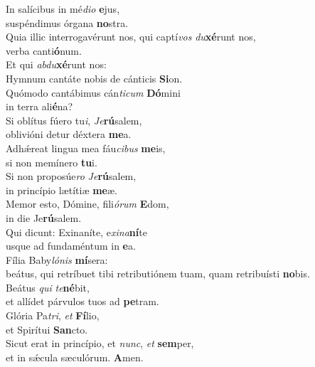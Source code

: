 \evenverse In salícibus in mé\textit{di}\textit{o} \textbf{e}jus,~\*\\
\evenverse suspéndimus órgana \textbf{no}stra.\\
\oddverse Quia illic interrogavérunt nos, qui captí\textit{vos} \textit{du}\textbf{xé}runt nos,~\*\\
\oddverse verba canti\textbf{ó}num.\\
\evenverse Et qui \textit{ab}\textit{du}\textbf{xé}runt nos:~\*\\
\evenverse Hymnum cantáte nobis de cánticis \textbf{Si}on.\\
\oddverse Quómodo cantábimus cán\textit{ti}\textit{cum} \textbf{Dó}mini~\*\\
\oddverse in terra ali\textbf{é}na?\\
\evenverse Si oblítus fúero tu\textit{i}, \textit{Je}\textbf{rú}salem,~\*\\
\evenverse oblivióni detur déxtera \textbf{me}a.\\
\oddverse Adhǽreat lingua mea fáu\textit{ci}\textit{bus} \textbf{me}is,~\*\\
\oddverse si non memínero \textbf{tu}i.\\
\evenverse Si non proposúe\textit{ro} \textit{Je}\textbf{rú}salem,~\*\\
\evenverse in princípio lætítiæ \textbf{me}æ.\\
\oddverse Memor esto, Dómine, fili\textit{ó}\textit{rum} \textbf{E}dom,~\*\\
\oddverse in die Je\textbf{rú}salem.\\
\evenverse Qui dicunt: Exinaníte, e\textit{xi}\textit{na}\textbf{ní}te~\*\\
\evenverse usque ad fundaméntum in \textbf{e}a.\\
\oddverse Fília Baby\textit{ló}\textit{nis} \textbf{mí}sera:~\*\\
\oddverse beátus, qui retríbuet tibi retributiónem tuam, quam retribuísti \textbf{no}bis.\\
\evenverse Beátus \textit{qui} \textit{te}\textbf{né}bit,~\*\\
\evenverse et allídet párvulos tuos ad \textbf{pe}tram.\\
\oddverse Glória Pa\textit{tri}, \textit{et} \textbf{Fí}lio,~\*\\
\oddverse et Spirítui \textbf{San}cto.\\
\evenverse Sicut erat in princípio, et \textit{nunc}, \textit{et} \textbf{sem}per,~\*\\
\evenverse et in sǽcula sæculórum. \textbf{A}men.\\
